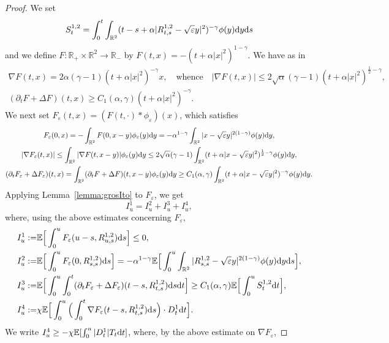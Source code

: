 \documentclass[11pt]{article}
\newcommand{\E}{\mathbb{E}}
\newcommand{\R}{\mathbb{R}}
\newcommand{\1}{\mathbbm{1}}
\newcommand{\dd}{{\rm d}}
\newcommand{\e}{\varepsilon}
\begin{document}
\begin{proof}
We set
$$
S^{1,2}_t=\int_0^t \int_{\R^2} (t-s + \alpha |R^{1,2}_{t,s}-\sqrt\e y|^2)^{-\gamma} \phi(y) \dd y  \dd s
$$
and we define $F:\R_+\times\R^2\to \R_-$ by $F(t, x)= - (t+\alpha|x|^2)^{1-\gamma}$. We have as in~\cite{FT1}
\begin{gather*}
\nabla F(t,x)= 2\alpha (\gamma-1) (t+\alpha|x|^2)^{-\gamma} x, \quad
\text{whence} \quad |\nabla F(t,x)| \leq 2\sqrt\alpha (\gamma-1)(t+\alpha|x|^2)^{\frac{1}{2}-\gamma}, \\
(\partial_t F + \Delta F)(t,x) \geq C_1(\alpha,\gamma)(t+\alpha|x|^2)^{-\gamma}.
\end{gather*}
We next set $F_\e(t,x)=(F(t,\cdot)\ast \phi_\e)(x)$, which satisfies
\begin{gather*}
F_\e(0,x)=-\int_{\R^2} F(0,x-y)\phi_\e(y) \dd y =-\alpha^{1-\gamma}\int_{\R^2} |x-\sqrt{\e}y |^{2(1-\gamma)}\phi(y)\dd y, \\
|\nabla F_\e(t,x)|\leq \int_{\R^2} |\nabla F(t,x-y)|\phi_\e(y) \dd y\leq 
2\sqrt\alpha (\gamma-1)\int_{\R^2}(t+\alpha|x-\sqrt\e y|^2)^{\frac{1}{2}-\gamma} \phi(y)\dd y,\\
(\partial_t F_\e + \Delta F_\e)(t,x) = \int_{\R^2}(\partial_t F + \Delta F)(t,x-y) \phi_\e(y)\dd y \geq C_1(\alpha,\gamma)\int_{\R^2}(t+\alpha|x-\sqrt\e y|^2)^{-\gamma} \phi(y)\dd y.
\end{gather*}
Applying  Lemma~\ref{lemma:grosIto} to $F_\e$, we get
\begin{equation}\label{eq:abeg}
I^{1}_u= I^{2}_u+I^{3}_u + I^{4}_u,
\end{equation}
where, using the above estimates concerning $F_\e$,
\begin{align}
I^{1}_u:=&\E \Big[\int_0^u F_\e(u-s, R^{1,2}_{u,s}) \dd s\Big]\leq 0, \label{eq:a}\\
I^{2}_u :=&\E \Big[\int_0^u F_\e(0, R^{1,2}_{s,s}) \dd s\Big]= -\alpha^{1-\gamma}\E \Big[\int_0^u \int_{\R^2}|R^{1,2}_{s,s}-\sqrt{\e}y|^{2(1-\gamma)} 
\phi(y) \dd y \dd s\Big],\label{eq:b}\\
I^{3}_u:=&  \E \Big[\int_0^u \int_0^t (\partial_t F_\e + \Delta F_\e) (t-s, R_{t,s}^{1,2})  \dd s \dd t \Big]
\geq C_1(\alpha,\gamma)\E\Big[\int_0^u  S^{1,2}_t \dd t \Big], \label{eq:c}\\ 
I^{4}_u:=&  \chi \E \Big[\int_0^u \Big(\int_0^t  \nabla F_\e(t-s, R_{t,s}^{1,2})\dd s\Big)\cdot D^{1}_t \dd t\Big]. 
\notag
\end{align}
We write $I^4_u \geq - \chi \E[\int_0^u  |D^{1}_t| T_t \dd t]$, where, by the above estimate on $\nabla F_\e$, 

\end{proof}
\end{document}
